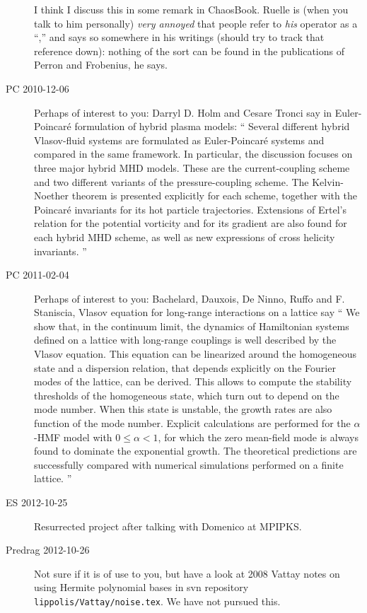 \begin{description}
I think I discuss this in some remark in ChaosBook. Ruelle is (when you
talk to him personally) \emph{very annoyed} that people refer to \emph{his}
operator as a ``\FPoper,'' and says so somewhere in his writings (should try to
track that reference down): nothing
of the sort can be found in the publications of Perron and Frobenius,
he says.

\item[PC 2010-12-06] Perhaps of interest to you:
Darryl D. Holm and  Cesare Tronci say in
{Euler-Poincar\'e formulation of hybrid plasma models}:
``
 Several different hybrid Vlasov-fluid systems are formulated as
Euler-Poincar\'e systems and compared in the same framework. In particular, the
discussion focuses on three major hybrid MHD models. These are the
current-coupling scheme and two different variants of the pressure-coupling
scheme. The Kelvin-Noether theorem is presented explicitly for each scheme,
together with the Poincar\'e invariants for its hot particle trajectories.
Extensions of Ertel's relation for the potential vorticity and for its gradient
are also found for each hybrid MHD scheme, as well as new expressions of cross
helicity invariants.
''

\item[PC 2011-02-04] Perhaps of interest to you:
Bachelard, Dauxois, De Ninno, Ruffo and F. Staniscia,
{Vlasov equation for long-range interactions on a lattice} say
    ``
 We show that, in the continuum limit, the dynamics of Hamiltonian systems
defined on a lattice with long-range couplings is well described by the Vlasov
equation. This equation can be linearized around the homogeneous state and a
dispersion relation, that depends explicitly on the Fourier modes of the
lattice, can be derived. This allows to compute the stability thresholds of the
homogeneous state, which turn out to depend on the mode number. When this state
is unstable, the growth rates are also function of the mode number. Explicit
calculations are performed for the $\alpha$-HMF model with $0 \leq \alpha <1$,
for which the zero mean-field mode is always found to dominate the exponential
growth. The theoretical predictions are successfully compared with numerical
simulations performed on a finite lattice.
    ''
\item[ES 2012-10-25] Resurrected project after talking with Domenico at MPIPKS.


\item[Predrag 2012-10-26]
Not sure if it is of use to you, but have a look at
2008 Vattay notes on using Hermite polynomial bases in svn repository
\texttt{lippolis/Vattay/noise.tex}. We have not pursued this.


\end{description}

